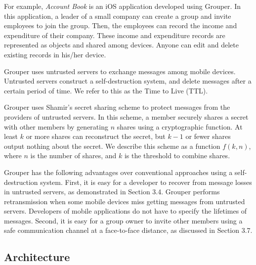 \documentclass[sigconf]{acmart}
\begin{document}
For example, \emph{Account Book} is an iOS application developed using Grouper. 
In this application, a leader of a small company can create a group and invite employees to join the group. 
Then, the employees can record the income and expenditure of their company.
These income and expenditure records are represented as objects and shared among devices.
Anyone can edit and delete existing records in his/her device.

Grouper uses untrusted servers to exchange messages among mobile devices.
Untrusted servers construct a self-destruction system, and delete messages after a certain period of time.
We refer to this as the Time to Live (TTL).

Grouper uses Shamir's secret sharing scheme to protect messages from the providers of untrusted servers.
In this scheme, a member securely shares a secret with other members by generating $n$ shares using a cryptographic function\cite{smith2013layered}. 
At least $k$ or more shares can reconstruct the secret, but $k-1$ or fewer shares output nothing about the secret\cite{pang2005new}. 
We describe this scheme as a function ${f(k, n)}$, where $n$ is the number of shares, and $k$ is the threshold to combine shares. 

Grouper has the following advantages over conventional approaches using a self-destruction system.
First, it is easy for a developer to recover from message losses in untrusted servers, as demonstrated in Section 3.4.
Grouper performs retransmission when some mobile devices miss getting messages from untrusted servers.
Developers of mobile applications do not have to specify the lifetimes of messages.
Second, it is easy for a group owner to invite other members using a safe communication channel at a face-to-face distance, as discussed in Section 3.7.

\subsection{Architecture}
\end{document}
